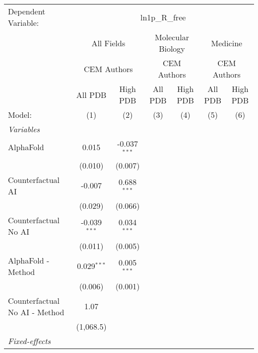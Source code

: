 \begingroup
\centering
\begin{tabular}{lcccccc}
   \tabularnewline \midrule \midrule
   Dependent Variable: & \multicolumn{6}{c}{ln1p\_R\_free}\\
 & \multicolumn{2}{c}{All Fields} & \multicolumn{2}{c}{Molecular Biology} & \multicolumn{2}{c}{Medicine} \\
\cmidrule(lr){2-3} \cmidrule(lr){4-5} \cmidrule(lr){6-7}
 & \multicolumn{2}{c}{CEM Authors} & \multicolumn{2}{c}{CEM Authors} & \multicolumn{2}{c}{CEM Authors} \\
\cmidrule(lr){2-3} \cmidrule(lr){4-5} \cmidrule(lr){6-7}
 & \multicolumn{1}{c}{All PDB} & \multicolumn{1}{c}{High PDB} & \multicolumn{1}{c}{All PDB} & \multicolumn{1}{c}{High PDB} & \multicolumn{1}{c}{All PDB} & \multicolumn{1}{c}{High PDB} \\
\cmidrule(lr){2-2} \cmidrule(lr){3-3} \cmidrule(lr){4-4} \cmidrule(lr){5-5} \cmidrule(lr){6-6} \cmidrule(lr){7-7}
   Model:                        & (1)            & (2)            & (3) & (4) & (5) & (6)\\  
   \midrule
   \emph{Variables}\\
   AlphaFold                     & 0.015          & -0.037$^{***}$ &     &     &     &   \\   
                                 & (0.010)        & (0.007)        &     &     &     &   \\   
   Counterfactual AI             & -0.007         & 0.688$^{***}$  &     &     &     &   \\   
                                 & (0.029)        & (0.066)        &     &     &     &   \\   
   Counterfactual No AI          & -0.039$^{***}$ & 0.034$^{***}$  &     &     &     &   \\   
                                 & (0.011)        & (0.005)        &     &     &     &   \\   
   AlphaFold - Method            & 0.029$^{***}$  & 0.005$^{***}$  &     &     &     &   \\   
                                 & (0.006)        & (0.001)        &     &     &     &   \\   
   Counterfactual No AI - Method & 1.07           &                &     &     &     &   \\   
                                 & (1,068.5)      &                &     &     &     &   \\   
   \midrule
   \emph{Fixed-effects}\\

\end{tabular}
